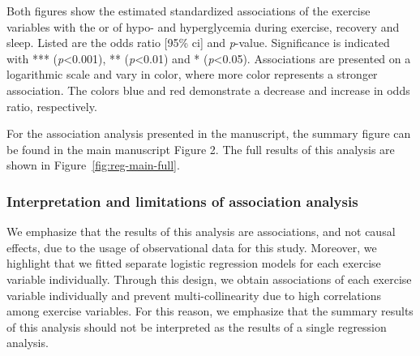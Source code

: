 \documentclass[11pt,a4paper]{article}
\newcommand\pval{\textit{p}}
\begin{document}
Both figures show the estimated standardized associations of the exercise variables with the \gls{or} of hypo- and hyperglycemia during exercise, recovery and sleep. Listed are the odds ratio [95\% \gls{ci}] and \pval-value. Significance is indicated with *** (\pval<0.001), ** (\pval<0.01) and * (\pval<0.05). Associations are presented on a logarithmic scale and vary in color, where more color represents a stronger association. The colors blue and red demonstrate a decrease and increase in odds ratio, respectively.

For the association analysis presented in the manuscript, the summary figure can be found in the main manuscript Figure 2. The full results of this analysis are shown in Figure~\ref{fig:reg-main-full}. 

\subsubsection{Interpretation and limitations of association analysis}
We emphasize that the results of this analysis are associations, and not causal effects, due to the usage of observational data for this study. Moreover, we highlight that we fitted separate logistic regression models for each exercise variable individually. Through this design, we obtain associations of each exercise variable individually and prevent multi-collinearity due to high correlations among exercise variables. For this reason, we emphasize that the summary results of this analysis should not be interpreted as the results of a single regression analysis. 
\end{document}
